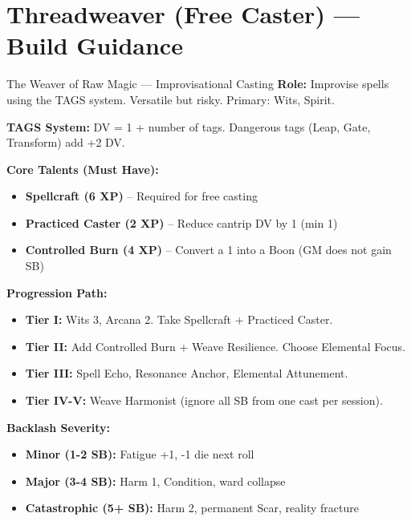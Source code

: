 \documentclass[10pt]{article}
\begin{document}
\newpage

\section*{Threadweaver (Free Caster) --- Build Guidance}

\begin{tipbox}{The Weaver of Raw Magic --- Improvisational Casting}
    \textbf{Role:} Improvise spells using the TAGS system. Versatile but risky. Primary: Wits, Spirit.
    
    \textbf{TAGS System:} DV = 1 + number of tags. Dangerous tags (Leap, Gate, Transform) add +2 DV.
    
    \textbf{Core Talents (Must Have):}
    \begin{itemize}
        \item \textbf{Spellcraft (6 XP)} -- Required for free casting
        \item \textbf{Practiced Caster (2 XP)} -- Reduce cantrip DV by 1 (min 1)
        \item \textbf{Controlled Burn (4 XP)} -- Convert a 1 into a Boon (GM does not gain SB)
    \end{itemize}
    
    \textbf{Progression Path:}
    \begin{itemize}
        \item \textbf{Tier I:} Wits 3, Arcana 2. Take Spellcraft + Practiced Caster.
        \item \textbf{Tier II:} Add Controlled Burn + Weave Resilience. Choose Elemental Focus.
        \item \textbf{Tier III:} Spell Echo, Resonance Anchor, Elemental Attunement.
        \item \textbf{Tier IV-V:} Weave Harmonist (ignore all SB from one cast per session).
    \end{itemize}
    
    \textbf{Backlash Severity:}
    \begin{itemize}
        \item \textbf{Minor (1-2 SB):} Fatigue +1, -1 die next roll
        \item \textbf{Major (3-4 SB):} Harm 1, Condition, ward collapse
        \item \textbf{Catastrophic (5+ SB):} Harm 2, permanent Scar, reality fracture
    \end{itemize}
\end{tipbox}
\end{document}
